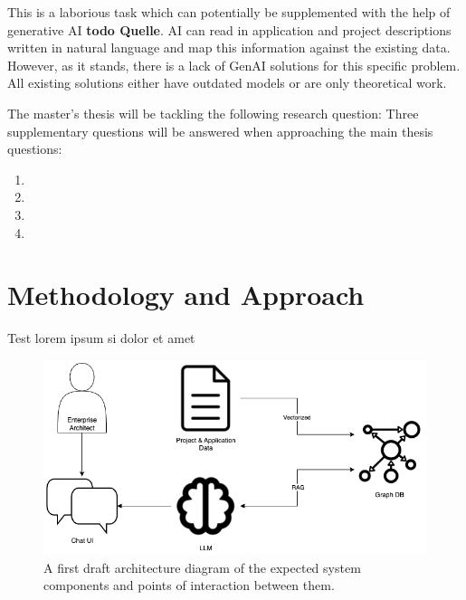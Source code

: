 \documentclass[english]{lni}
\begin{document}
This is a laborious task which can potentially be supplemented with the help of generative AI \textbf{todo Quelle}. AI can read in application and project descriptions written in natural language and map this information against the existing data. However, as it stands, there is a lack of GenAI solutions for this specific problem. All existing solutions either have outdated models or are only theoretical work.

The master's thesis will be tackling the following research question:  Three supplementary questions will be answered when approaching the main thesis questions:
\begin{enumerate}
    \item {}
    \item {}
    \item {}
    \item {}
\end{enumerate}


\section{Methodology and Approach}
Test lorem ipsum si dolor et amet \cite{ettinger2025enterprise}

\begin{figure}[h]
\centering
\includegraphics[scale=0.5]{./architecture_diagram.png}
\caption{A first draft architecture diagram of the expected system components and points of interaction between them.}
\end{figure}
\end{document}
